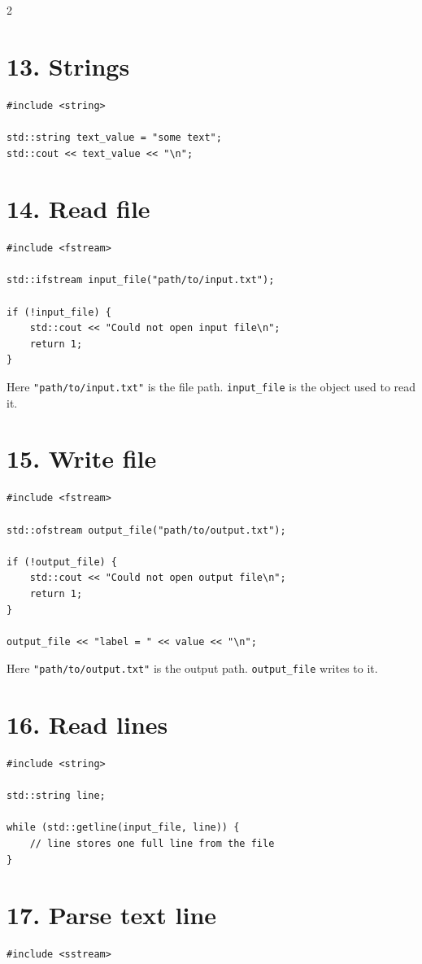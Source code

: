 \documentclass[10pt]{article}
\begin{document}
\begin{multicols}{2}
\section{13. Strings}
\begin{lstlisting}[style=cppstyle]
#include <string>

std::string text_value = "some text";
std::cout << text_value << "\n";
\end{lstlisting}

\section{14. Read file}
\begin{lstlisting}[style=cppstyle]
#include <fstream>

std::ifstream input_file("path/to/input.txt");

if (!input_file) {
    std::cout << "Could not open input file\n";
    return 1;
}
\end{lstlisting}

Here \texttt{"path/to/input.txt"} is the file path. \texttt{input\_file} is the object used to read it.

\section{15. Write file}
\begin{lstlisting}[style=cppstyle]
#include <fstream>

std::ofstream output_file("path/to/output.txt");

if (!output_file) {
    std::cout << "Could not open output file\n";
    return 1;
}

output_file << "label = " << value << "\n";
\end{lstlisting}

Here \texttt{"path/to/output.txt"} is the output path. \texttt{output\_file} writes to it.

\section{16. Read lines}
\begin{lstlisting}[style=cppstyle]
#include <string>

std::string line;

while (std::getline(input_file, line)) {
    // line stores one full line from the file
}
\end{lstlisting}

\section{17. Parse text line}
\begin{lstlisting}[style=cppstyle]
#include <sstream>


\end{lstlisting}
\end{multicols}
\end{document}
